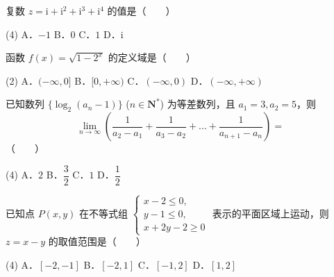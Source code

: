 

\begin{question}
复数 $z = \mathrm{i} + \mathrm{i}^2 + \mathrm{i}^3 + \mathrm{i}^4$ 的值是\mbox{（　　）}

\begin{gkopts}(4)
\task A．$-1$
\task B．$0$
\task C．$1$
\task D．$\mathrm{i}$
\end{gkopts}

\end{question}
\begin{question}
函数 $f(x) = \sqrt{1 - 2^x}$ 的定义域是\mbox{（　　）}

\begin{gkopts}(2)
\task A．$(-\infty, 0]$
\task B．$[0, +\infty)$
\task C．$(-\infty, 0)$
\task D．$(-\infty, +\infty)$
\end{gkopts}

\end{question}
\begin{question}
已知数列 $\{\log_2(a_n - 1)\}$ ($n \in \mathbf{N}^*$) 为等差数列，且 $a_1 = 3, a_2 = 5$，则
\nopagebreak[4]
\[
\lim_{n\to\infty} \left(\frac{1}{a_2 - a_1} + \frac{1}{a_3 - a_2} + \dots + \frac{1}{a_{n+1} - a_n}\right) =
\]
\mbox{（　　）}

\begin{gkopts}(4)
\task A．$2$
\task B．$\dfrac{3}{2}$
\task C．$1$
\task D．$\dfrac{1}{2}$
\end{gkopts}

\end{question}
\begin{question}
已知点 $P(x, y)$ 在不等式组 $\begin{cases} x - 2 \leqslant 0, \\ y - 1 \leqslant 0, \\ x + 2y - 2 \geqslant 0 \end{cases}$ 表示的平面区域上运动，则 $z = x - y$ 的取值范围是\mbox{（　　）}

\begin{gkopts}(4)
\task A．$[-2, -1]$
\task B．$[-2, 1]$
\task C．$[-1, 2]$
\task D．$[1, 2]$
\end{gkopts}

\Needspace{0.4\textheight}
\end{question}
